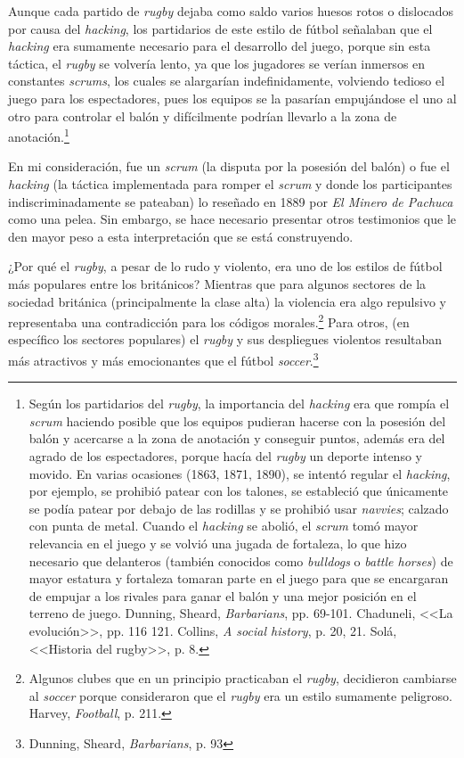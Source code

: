 \documentclass[11pt,a5paper,twoside]{book} %
\begin{document}
Aunque cada partido de \emph{rugby} dejaba como saldo varios huesos rotos o dislocados por causa del \emph{hacking}, los partidarios de este estilo de fútbol señalaban que el \emph{hacking} era sumamente necesario para el desarrollo del juego, porque sin esta táctica, el \emph{rugby} se volvería lento, ya que los jugadores se verían inmersos en constantes \emph{scrums}, los cuales se alargarían indefinidamente, volviendo tedioso el juego para los espectadores, pues los equipos se la pasarían empujándose el uno al otro para controlar el balón y difícilmente podrían llevarlo a la zona de anotación.\footnote{Según los partidarios del \emph{rugby}, la importancia del \emph{hacking} era que rompía el \emph{scrum} haciendo posible que los equipos pudieran hacerse con la posesión del balón y acercarse a la zona de anotación y conseguir puntos, además era del agrado de los espectadores, porque hacía del \emph{rugby} un deporte intenso y movido. En varias ocasiones (1863, 1871, 1890), se intentó regular el \emph{hacking}, por ejemplo, se prohibió patear con los talones, se estableció que únicamente se podía patear por debajo de las rodillas y se prohibió usar \emph{navvies}; calzado con punta de metal. Cuando el \emph{hacking} se abolió, el \emph{scrum} tomó mayor relevancia en el juego y se volvió una jugada de fortaleza, lo que hizo necesario que delanteros (también conocidos como \emph{bulldogs} o \emph{battle horses}) de mayor estatura y fortaleza tomaran parte en el juego para que se encargaran de empujar a los rivales para ganar el balón y una mejor posición en el terreno de juego. Dunning, Sheard, \emph{Barbarians}, pp. 69-101. Chaduneli, <<La evolución>>, pp. 116 121. Collins, \emph{A social history}, p. 20, 21. Solá, <<Historia del rugby>>, p. 8.}

En mi consideración, fue un \emph{scrum} (la disputa por la posesión del balón) o fue el \emph{hacking} (la táctica implementada para romper el \emph{scrum} y donde los participantes indiscriminadamente se pateaban) lo reseñado en 1889 por \emph{El Minero de Pachuca} como una pelea. Sin embargo, se hace necesario presentar otros testimonios que le den mayor peso a esta interpretación que se está construyendo.

¿Por qué el \emph{rugby}, a pesar de lo rudo y violento, era uno de los estilos de fútbol más populares entre los británicos? Mientras que para algunos sectores de la sociedad británica (principalmente la clase alta) la violencia era algo repulsivo y representaba una contradicción para los códigos morales.\footnote{Algunos clubes que en un principio practicaban el \emph{rugby}, decidieron cambiarse al \emph{soccer} porque consideraron que el \emph{rugby} era un estilo sumamente peligroso. Harvey, \emph{Football}, p. 211.} Para otros, (en específico los sectores populares) el \emph{rugby} y sus despliegues violentos resultaban más atractivos y más emocionantes que el fútbol \emph{soccer}.\footnote{Dunning, Sheard, \emph{Barbarians}, p. 93}
\end{document}
